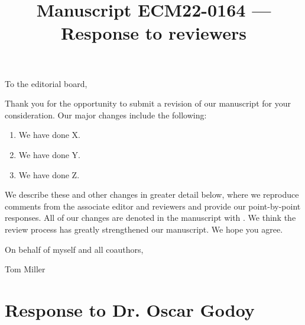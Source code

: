 \documentclass[12pt]{article}
\newcommand{\revise}[1]{{\color{Mahogany}{#1}}}
\begin{document}
\title{Manuscript ECM22-0164 --- Response to reviewers}

\maketitle
\noindent To the editorial board,

Thank you for the opportunity to submit a revision of our manuscript for your consideration. Our major changes include the following:
\begin{enumerate}
	\item We have done X.
	\item We have done Y.
	\item We have done Z.
\end{enumerate}

We describe these and other changes in greater detail below, where we reproduce comments from the associate editor and reviewers and provide our point-by-point responses. 
All of our changes are denoted in the manuscript with \revise{Mahogany font}.
We think the review process has greatly strengthened our manuscript.
We hope you agree. 

\vspace{2em}
\hfill On behalf of myself and all coauthors,

\hfill Tom Miller
\newpage

\section{Response to Dr. Oscar Godoy}
\vspace{-2em}
\end{document}
